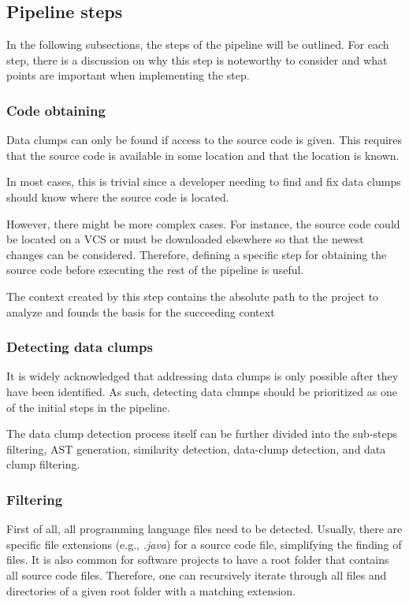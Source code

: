 \subsection{Pipeline steps}\label{sec:pipeline_steps}
In the following subsections, the steps of the pipeline will be outlined. For each step, there is a discussion on why this step is noteworthy to consider and what points are important when implementing the step.
\subsubsection{Code obtaining}\label{sec:code_obtaining}
Data clumps can only be found if access to the source code is given. This requires that the source code is available in some location and that the location is known.

In most cases, this is trivial since a developer needing to find and fix data clumps should know where the source code is located.

However, there might be more complex cases. For instance, the source code could be located on a \ac{VCS} or must be downloaded elsewhere so that the newest changes can be considered. Therefore, defining a specific step for obtaining the source code before executing the rest of the pipeline is useful. 

The context created by this step contains the absolute path to the project to analyze and founds the basis for the succeeding context
\subsubsection{Detecting data clumps}\label{subsec:chap3_data_clump_detection}
It is widely acknowledged that addressing data clumps is only possible after they have been identified. As such, detecting data clumps should be prioritized as one of the initial steps in the pipeline.

The data clump detection process itself can be further divided into the sub-steps filtering, \ac{AST} generation, similarity detection, data-clump detection, and data clump filtering.
\subsubsection{Filtering}\label{subsub:filtering_files}
First of all, all programming language files need to be detected. Usually, there are specific file extensions (e.g., \textit{.java}) for a source code file, simplifying the finding of files. It is also common for software projects to have a root folder that contains all source code files. Therefore, one can recursively iterate through all files and directories of a given root folder with a matching extension. 

